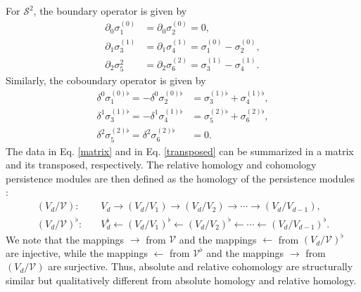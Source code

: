 \begin{example}
	For $\mathcal{S}^{2}$, the boundary operator is given by
	\begin{align}
		\label{matrix}
		\partial_0\sigma^{(0)}_{1} & = \partial_0\sigma^{(0)}_{2} = 0, \nonumber\\
		\partial_1\sigma_{3}^{(1)} & = \partial_1\sigma_{4}^{(1)} = \sigma_{1}^{(0)}-\sigma_{2}^{(0)}, \nonumber\\
		\partial_2\sigma_{5}^{2} & = \partial_2\sigma_{6}^{(2)} = \sigma_{3}^{(1)} - \sigma_{4}^{(1)}.
	\end{align}
	Similarly, the coboundary operator is given by
	\begin{align}
		\label{transposed}
		\delta^0\sigma_{1}^{(0)\flat} = -\delta^0\sigma_{2}^{(0)\flat} & = \sigma_{3}^{(1)\flat} + \sigma_{4}^{(1)\flat}, \nonumber\\
		\delta^1\sigma_{3}^{(1)\flat} = -\delta^1\sigma_{4}^{(1)\flat} & = \sigma_{5}^{(2)\flat} + \sigma_{6}^{(2)\flat}, \nonumber\\
		\delta^2\sigma_{5}^{(2)\flat} = \delta^2\sigma_{6}^{(2)\flat}  & = 0.
	\end{align}
	The data in Eq. \ref{matrix} and in Eq. \ref{transposed} can be summarized in a matrix and its transposed, respectively. The relative homology and cohomology persistence modules are then defined as the homology of the persistence modules \cite[\S 2.6, Example]{de2011dualities}:
	\begin{align}
		(V_{d}/\mathcal{V}):         & \quad V_{d} \rightarrow (V_{d}/V_{1}) \rightarrow (V_{d}/V_{2}) \rightarrow \cdots \rightarrow (V_{d}/V_{d-1}),                             \\
		(V_{d}/\mathcal{V})^{\flat}: & \quad V_{d}^{\flat} \leftarrow (V_{d}/V_{1})^{\flat} \leftarrow (V_{d}/V_{2})^{\flat} \leftarrow \cdots \leftarrow (V_{d}/V_{d-1})^{\flat}.
	\end{align}
	We note that the mappings $\rightarrow$ from $\mathcal{V}$ and the mappings $\leftarrow$
	from $(V_{d}/\mathcal{V})^{\flat}$ are injective, while the mappings
	$\leftarrow$ from $\mathcal{V}^{\flat}$ and the mappings $\rightarrow$ from
	$(V_{d}/\mathcal{V})$ are surjective. Thus, absolute and relative cohomology
	are structurally similar but qualitatively different from absolute homology
	and relative homology.
\end{example}

